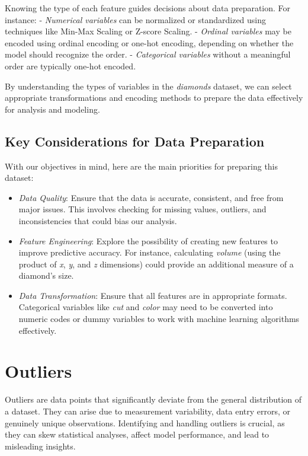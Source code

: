 \documentclass[
  11pt,
]{book}
\providecommand{\tightlist}{%
  \setlength{\itemsep}{0pt}\setlength{\parskip}{0pt}}
\theoremstyle{definition}
\theoremstyle{definition}
\theoremstyle{definition}
\theoremstyle{definition}
\theoremstyle{remark}
\begin{document}
Knowing the type of each feature guides decisions about data preparation. For instance:
- \emph{Numerical variables} can be normalized or standardized using techniques like Min-Max Scaling or Z-score Scaling.
- \emph{Ordinal variables} may be encoded using ordinal encoding or one-hot encoding, depending on whether the model should recognize the order.
- \emph{Categorical variables} without a meaningful order are typically one-hot encoded.

By understanding the types of variables in the \emph{diamonds} dataset, we can select appropriate transformations and encoding methods to prepare the data effectively for analysis and modeling.

\subsection*{Key Considerations for Data Preparation}\label{key-considerations-for-data-preparation}


With our objectives in mind, here are the main priorities for preparing this dataset:

\begin{itemize}
\tightlist
\item
  \emph{Data Quality}: Ensure that the data is accurate, consistent, and free from major issues. This involves checking for missing values, outliers, and inconsistencies that could bias our analysis.
\item
  \emph{Feature Engineering}: Explore the possibility of creating new features to improve predictive accuracy. For instance, calculating \emph{volume} (using the product of \emph{x}, \emph{y}, and \emph{z} dimensions) could provide an additional measure of a diamond's size.
\item
  \emph{Data Transformation}: Ensure that all features are in appropriate formats. Categorical variables like \emph{cut} and \emph{color} may need to be converted into numeric codes or dummy variables to work with machine learning algorithms effectively.
\end{itemize}

\section{Outliers}\label{Data-pre-outliers}

Outliers are data points that significantly deviate from the general distribution of a dataset. They can arise due to measurement variability, data entry errors, or genuinely unique observations. Identifying and handling outliers is crucial, as they can skew statistical analyses, affect model performance, and lead to misleading insights.
\end{document}
